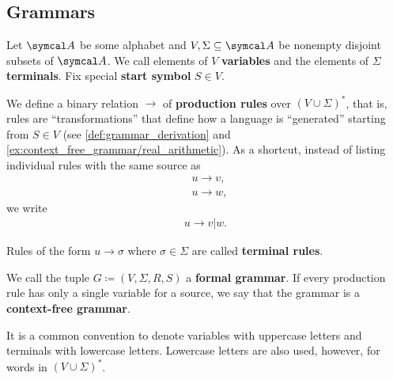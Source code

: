 \subsection{Grammars}\label{subsec:grammars}

\begin{definition}\label{def:grammar}\cite[definition 2.2]{Sipser2013}
  Let \( \Cal{A} \) be some alphabet and \( V, \Sigma \subseteq \Cal{A} \) be nonempty disjoint subsets of \( \Cal{A} \). We call elements of \( V \) \textbf{variables} and the elements of \( \Sigma \) \textbf{terminals}. Fix special \textbf{start symbol} \( S \in V \).

  We define a binary relation \( \to \) of \textbf{production rules} over \( (V \cup \Sigma)^* \), that is, rules are \enquote{transformations} that define how a language is \enquote{generated} starting from \( S \in V \) (see \cref{def:grammar_derivation} and \cref{ex:context_free_grammar/real_arithmetic}). As a shortcut, instead of listing individual rules with the same source as
  \begin{align*}
    &u \to v, \\
    &u \to w,
  \end{align*}
  we write
  \begin{align*}
    u \to v | w.
  \end{align*}

  Rules of the form \( u \to \sigma \) where \( \sigma \in \Sigma \) are called \textbf{terminal rules}.

  We call the tuple \( G \coloneqq (V, \Sigma, R, S) \) a \textbf{formal grammar}. If every production rule has only a single variable for a source, we say that the grammar is a \textbf{context-free grammar}.
\end{definition}

\begin{note}\label{note:grammar_symbol_case}
  It is a common convention to denote variables with uppercase letters and terminals with lowercase letters. Lowercase letters are also used, however, for words in \( (V \cup \Sigma)^* \).
\end{note}

